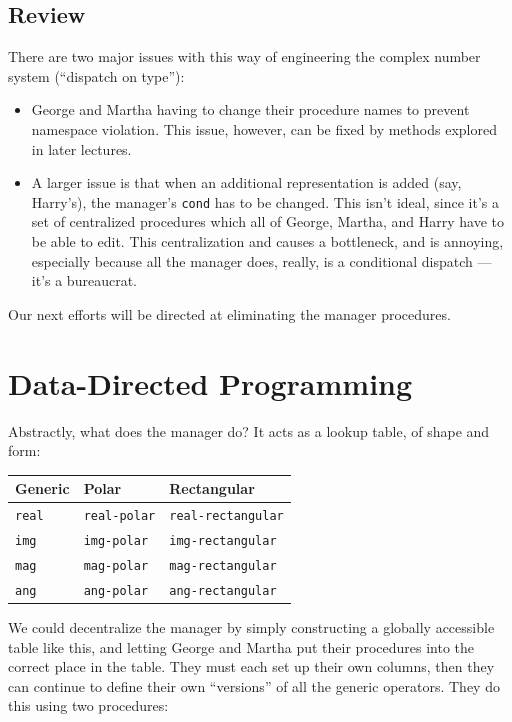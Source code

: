 \documentclass[9pt]{report}
\begin{document}
\subsection{Review}
\label{sec:orge35fa05}
There are two major issues with this way of engineering the
complex number system (``dispatch on type''):
\begin{itemize}
\item George and Martha having to change their procedure names to
prevent namespace violation. This issue, however, can be fixed
by methods explored in later lectures.
\item A larger issue is that when an additional representation is
added (say, Harry's), the manager's \texttt{cond} has to be changed.
This isn't ideal, since it's a set of centralized procedures
which all of George, Martha, and Harry have to be able to edit.
This centralization and causes a bottleneck, and is annoying,
especially because all the manager does, really, is a
conditional dispatch --- it's a bureaucrat.
\end{itemize}

Our next efforts will be directed at eliminating the manager
procedures.

\section{Data-Directed Programming}
\label{sec:org93711c9}

Abstractly, what does the manager do? It acts as a lookup table, of
shape and form:

\begin{center}
\begin{tabular}{lll}
\toprule
Generic & Polar & Rectangular\\
\midrule
\texttt{real} & \texttt{real-polar} & \texttt{real-rectangular}\\
\texttt{img} & \texttt{img-polar} & \texttt{img-rectangular}\\
\texttt{mag} & \texttt{mag-polar} & \texttt{mag-rectangular}\\
\texttt{ang} & \texttt{ang-polar} & \texttt{ang-rectangular}\\
\bottomrule
\end{tabular}
\end{center}

We could decentralize the manager by simply constructing a globally
accessible table like this, and letting George and Martha put their
procedures into the correct place in the table. They must each set
up their own columns, then they can continue to define their own
``versions'' of all the generic operators. They do this using two
procedures:
\end{document}
